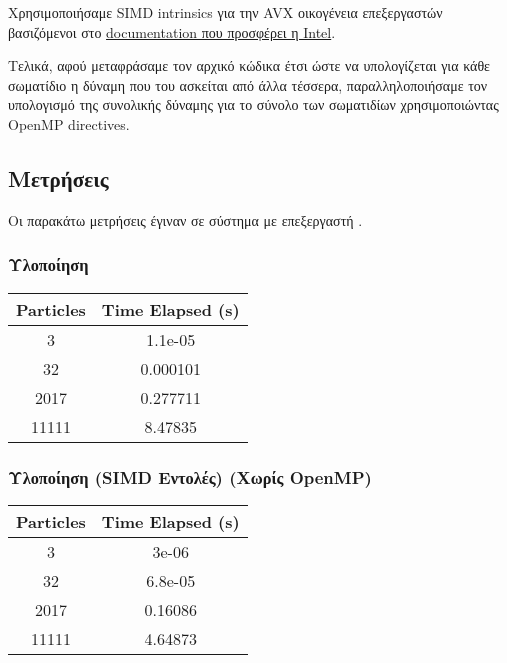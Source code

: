 \documentclass[11pt]{scrartcl} %
\begin{document}
Χρησιμοποιήσαμε SIMD intrinsics για την AVX οικογένεια επεξεργαστών βασιζόμενοι στο \href{https://www.intel.com/content/www/us/en/docs/intrinsics-guide/index.html#text=mm256_loadu_pd&ig_expand=4488&techs=AVX_ALL}{documentation που προσφέρει η Intel}.

Τελικά, αφού μεταφράσαμε τον αρχικό κώδικα έτσι ώστε να υπολογίζεται για κάθε σωματίδιο η δύναμη που του ασκείται
από άλλα τέσσερα, παραλληλοποιήσαμε τον υπολογισμό της συνολικής δύναμης για το σύνολο των σωματιδίων χρησιμοποιώντας 
OpenMP directives.

\subsection{Μετρήσεις}

Οι παρακάτω μετρήσεις έγιναν σε σύστημα με επεξεργαστή .

\subsubsection{ Υλοποίηση}

\begin{table}[!ht]
    \centering
    \begin{tabular}{|c|c|}
    \hline
        \textbf{Particles} & \textbf{Time Elapsed (s)} \\ \hline
        3     & 1.1e-05  \\ \hline 
        32    & 0.000101 \\ \hline
        2017  & 0.277711 \\ \hline
        11111 & 8.47835  \\ \hline
    \end{tabular}
\end{table}

\subsubsection{ Υλοποίηση (SIMD Εντολές) (Χωρίς OpenMP)}

\begin{table}[!ht]
    \centering
    \begin{tabular}{|c|c|}
    \hline
        \textbf{Particles} & \textbf{Time Elapsed (s)} \\ \hline
            3     & 3e-06    \\ \hline
            32    & 6.8e-05  \\ \hline
            2017  & 0.16086  \\ \hline
            11111 & 4.64873  \\ \hline
    \end{tabular}
\end{table}
\end{document}
